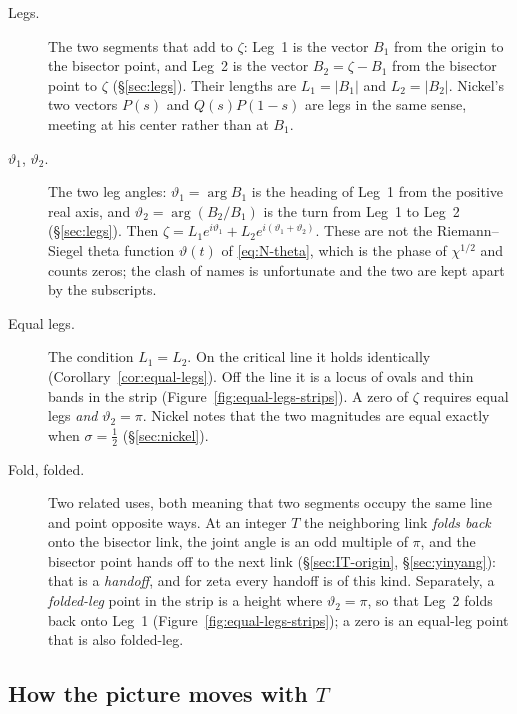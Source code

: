 \documentclass[11pt]{article}
\theoremstyle{definition}
\begin{document}
\begin{description}
\item[Legs.]
The two segments that add to $\zeta$: Leg~1 is the vector $B_1$
from the origin to the bisector point, and Leg~2 is the vector
$B_2=\zeta-B_1$ from the bisector point to $\zeta$
(\S\ref{sec:legs}).
Their lengths are $L_1=|B_1|$ and $L_2=|B_2|$.
Nickel's two vectors $P(s)$ and $Q(s)P(1-s)$ are legs in the same
sense, meeting at his center rather than at $B_1$.

\item[$\vartheta_1$, $\vartheta_2$.]
The two leg angles:
$\vartheta_1=\arg B_1$ is the heading of Leg~1 from the positive
real axis, and
$\vartheta_2=\arg(B_2/B_1)$ is the turn from Leg~1 to Leg~2
(\S\ref{sec:legs}).
Then $\zeta=L_1 e^{i\vartheta_1}+L_2 e^{i(\vartheta_1+\vartheta_2)}$.
These are not the Riemann--Siegel theta function $\vartheta(t)$ of
\eqref{eq:N-theta}, which is the phase of $\chi^{1/2}$ and counts
zeros; the clash of names is unfortunate and the two are kept
apart by the subscripts.

\item[Equal legs.]
The condition $L_1=L_2$.
On the critical line it holds identically
(Corollary~\ref{cor:equal-legs}).
Off the line it is a locus of ovals and thin bands in the strip
(Figure~\ref{fig:equal-legs-strips}).
A zero of $\zeta$ requires equal legs \emph{and} $\vartheta_2=\pi$.
Nickel notes that the two magnitudes are equal exactly when
$\sigma=\tfrac12$ (\S\ref{sec:nickel}).

\item[Fold, folded.]
Two related uses, both meaning that two segments occupy the same
line and point opposite ways.
At an integer $T$ the neighboring link \emph{folds back} onto the
bisector link, the joint angle is an odd multiple of $\pi$, and
the bisector point hands off to the next link
(\S\ref{sec:IT-origin}, \S\ref{sec:yinyang}): that is a
\emph{handoff}, and for zeta every handoff is of this kind.
Separately, a \emph{folded-leg} point in the strip is a height
where $\vartheta_2=\pi$, so that Leg~2 folds back onto Leg~1
(Figure~\ref{fig:equal-legs-strips}); a zero is an equal-leg point
that is also folded-leg.
\end{description}

\subsection*{How the picture moves with $T$}
\end{document}
